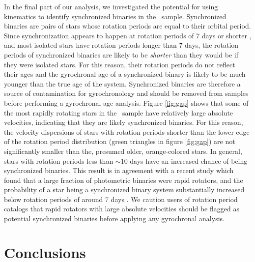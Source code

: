 \documentclass{aastex63}
\newcommand{\mct}{\citet{mcquillan2014}}
\begin{document}
In the final part of our analysis, we investigated the potential for using
kinematics to identify synchronized binaries in the \mct\ sample.
Synchronized binaries are pairs of stars whose rotation periods are equal to
their orbital period.
Since synchronization appears to happen at rotation periods of 7 days or
shorter \citep{simonian2019}, and most isolated stars have rotation periods
longer than 7 days, the rotation periods of synchronized binaries are likely
to be {\it shorter} than they would be if they were isolated stars.
For this reason, their rotation periods do not reflect their ages and the
gyrochronal age of a synchronized binary is likely to be much younger than the
true age of the system.
Synchronized binaries are therefore a source of contamination for
gyrochronology and should be removed from samples before performing a
gyrochronal age analysis.
Figure \ref{fig:gap} shows that some of the most rapidly rotating stars in the
\mct\ sample have relatively large absolute velocities, indicating that they
are likely synchronized binaries.
For this reason, the velocity dispersions of stars with rotation periods
shorter than the lower edge of the rotation period distribution (green
triangles in figure \ref{fig:gap}) are not significantly smaller than the,
presumed older, orange-colored stars.
In general, stars with rotation periods less than $\sim$10 days have an
increased chance of being synchronized binaries.
This result is in agreement with a recent study which found that a large
fraction of photometric binaries were rapid rotators, and the probability of a
star being a synchronized binary system substantially increased below rotation
periods of around 7 days \citep{simonian2019}.
We caution users of rotation period catalogs that rapid rotators with large
absolute velocities should be flagged as potential synchronized binaries
before applying any gyrochronal analysis.

\section{Conclusions}
\end{document}
